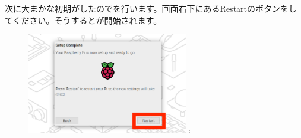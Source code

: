 \documentclass[a4paper,12pt]{jarticle}
\begin{document}
\begin{enumerate}
\begin{itemize}
                        次に大まかな初期がしたのでを行います。画面右下にあるRestartのボタンをしてください。そうするとが開始されます。
                        \begin{figure}[h]
                          \centering
                          \begin{minipage}{5.228cm}
                            {\upshape
                              \includegraphics[width=7.000cm]{sw_image08.png}
                              \newline
                              {\theFigure\label{seq:refFigure19}}:
                               }
                          \end{minipage}
                        \end{figure}
                  \end{itemize}

\clearpage
\end{enumerate}
\end{document}
